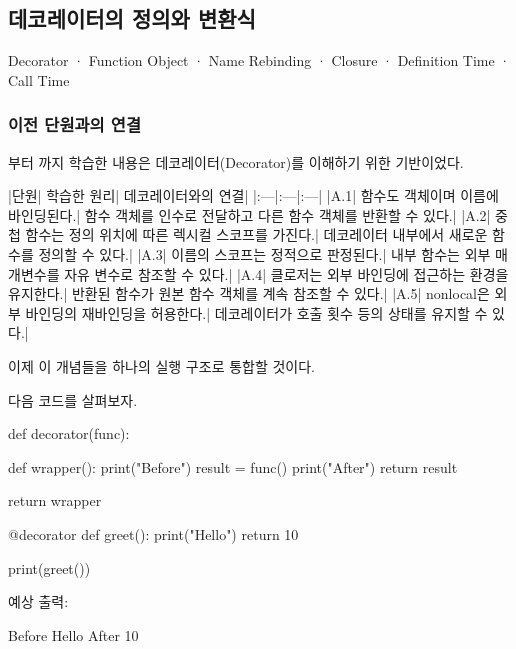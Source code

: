 

\subsection{데코레이터의 정의와  변환식}

Decorator · Function Object · Name Rebinding · Closure · Definition Time · Call Time

\subsubsection{이전 단원과의 연결}

부터 까지 학습한 내용은 데코레이터(Decorator)를 이해하기 위한 기반이었다.

\begin{dhktable}
|단원|	학습한 원리|	데코레이터와의 연결|
|:---|:---|:---|
|A.1|	함수도 객체이며 이름에 바인딩된다.|	함수 객체를 인수로 전달하고 다른 함수 객체를 반환할 수 있다.|
|A.2|	중첩 함수는 정의 위치에 따른 렉시컬 스코프를 가진다.|	데코레이터 내부에서 새로운 함수를 정의할 수 있다.|
|A.3|	이름의 스코프는 정적으로 판정된다.|	내부 함수는 외부 매개변수를 자유 변수로 참조할 수 있다.|
|A.4|	클로저는 외부 바인딩에 접근하는 환경을 유지한다.|	반환된 함수가 원본 함수 객체를 계속 참조할 수 있다.|
|A.5|	nonlocal은 외부 바인딩의 재바인딩을 허용한다.|	데코레이터가 호출 횟수 등의 상태를 유지할 수 있다.|
\end{dhktable}

이제 이 개념들을 하나의 실행 구조로 통합할 것이다.

다음 코드를 살펴보자.

\begin{dhkcode}
def decorator(func):

    def wrapper():
        print("Before")
        result = func()
        print("After")
        return result

    return wrapper


@decorator
def greet():
    print("Hello")
    return 10


print(greet())
\end{dhkcode}

예상 출력:

\begin{dhkzsh}
Before
Hello
After
10
\end{dhkzsh}

